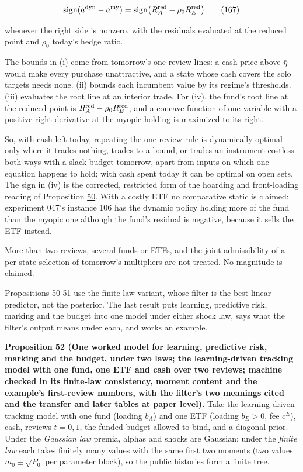 \documentclass[11pt]{article}
\begin{document}
\begin{equation*}
\mathrm{sign}(a^{\rm dyn}-a^{\rm my})=\mathrm{sign}\bigl(R^{\rm red}_A-\rho_0R^{\rm red}_E\bigr)\tag{167}\label{eq:167}
\end{equation*}

whenever the right side is nonzero, with the residuals evaluated at the
reduced point and \(\rho_0\) today's hedge ratio.

The bounds in (i) come from tomorrow's one-review lines: a cash price
above \(\bar\eta\) would make every purchase unattractive, and a state whose
cash covers the solo targets needs none. (ii) bounds each incumbent
value by its regime's thresholds. (iii) evaluates the root line at an
interior trade. For (iv), the fund's root line at the reduced point is
\(R^{\rm red}_A-\rho_0R^{\rm red}_E\), and a concave function of one variable with a
positive right derivative at the myopic holding is maximized to its
right.

So, with cash left today, repeating the one-review rule is dynamically
optimal only where it trades nothing, trades to a bound, or trades an
instrument costless both ways with a slack budget tomorrow, apart from
inputs on which one equation happens to hold; with cash spent today it
can be optimal on open sets. The sign in (iv) is the corrected,
restricted form of the hoarding and front-loading reading of
Proposition \hyperref[res:Proposition-50]{50}. With a costly ETF no comparative static is claimed:
experiment 047's instance 106 has the dynamic policy holding more of
the fund than the myopic one although the fund's residual is negative,
because it sells the ETF instead.

More than two reviews, several funds or ETFs, and the joint
admissibility of a per-state selection of tomorrow's multipliers are
not treated. No magnitude is claimed.

Propositions \hyperref[res:Proposition-50]{50}-51 use the finite-law variant, whose filter is the best
linear predictor, not the posterior. The last result puts learning,
predictive risk, marking and the budget into one model under either
shock law, says what the filter's output means under each, and works
an example.

\label{res:Proposition-52}
\textbf{Proposition 52 (One worked model for learning, predictive risk, marking and the budget, under two laws; the learning-driven tracking model with one fund, one ETF and cash over two reviews; machine checked in its finite-law consistency, moment content and the example's first-review numbers, with the filter's two meanings cited and the transfer and later tables at paper level).}
Take the learning-driven tracking model with one fund (loading \(b_A\)) and
one ETF (loading \(b_E>0\), fee \(c^E\)), cash, reviews \(t=0,1\), the funded budget
allowed to bind, and a diagonal prior. Under the \emph{Gaussian law} premia,
alphas and shocks are Gaussian; under the \emph{finite law} each takes
finitely many values with the same first two moments (two values
\(m_0\pm\sqrt{P_0}\) per parameter block), so the public histories form a finite
tree.
\end{document}
